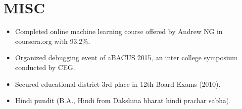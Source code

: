 \documentclass[11pt,a4paper]{article}
\begin{document}
\section*{MISC}

\begin{itemize}[noitemsep]
\item Completed online machine learning course offered by Andrew NG in coursera.org with 93.2\%.
\item Organized debugging event of aBACUS 2015, an inter college symposium conducted by CEG.
\item Secured educational district 3rd place in 12th Board Exams (2010).
\item Hindi pundit (B.A., Hindi from Dakshina bharat hindi prachar sabha).
\end{itemize}
\end{document}
